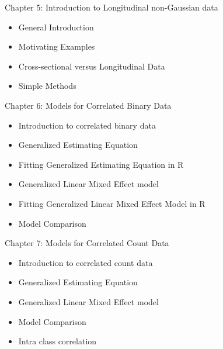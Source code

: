 \documentclass{beamer}
\begin{document}
\begin{frame}{Chapter 5: Introduction to Longitudinal non-Gaussian data}
\begin{itemize}
	\item General Introduction \vspace{0.5cm}
	\item Motivating Examples \vspace{0.5cm}
	\item Cross-sectional versus Longitudinal Data \vspace{0.5cm}
	\item Simple Methods \vspace{0.5cm}
\end{itemize}
\end{frame}

\begin{frame}{Chapter 6: Models for Correlated Binary Data}
\begin{itemize}
\item Introduction to correlated binary data \vspace{0.5cm}
\item Generalized Estimating Equation \vspace{0.5cm}
\item Fitting Generalized Estimating Equation in R  \vspace{0.5cm}
\item Generalized Linear Mixed Effect model \vspace{0.5cm}
\item Fitting Generalized Linear Mixed Effect Model in R \vspace{0.5cm}
\item Model Comparison \vspace{0.5cm}

\end{itemize}
\end{frame}

\begin{frame}{Chapter 7: Models for Correlated Count Data}
\begin{itemize}
	\item Introduction to correlated count data \vspace{0.5cm}
	\item Generalized Estimating Equation \vspace{0.5cm}
	\item Generalized Linear Mixed Effect model \vspace{0.5cm}
	\item Model Comparison \vspace{0.5cm}
	\item Intra class correlation
\end{itemize}
\end{frame}
\end{document}
